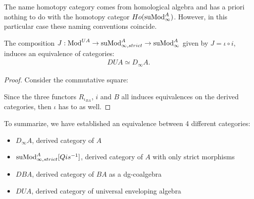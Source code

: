 \documentclass[../thesis.tex]{subfiles}
\begin{document}
            \begin{remark}
                The name homotopy category comes from homological algebra and has a priori nothing to do with the homotopy categor $Ho(\tt{suMod}_\infty^A)$. However, in this particular case these naming conventions coincide.
            \end{remark}

            \begin{lemma}
                The composition $J : \tt{Mod}^{UA} \to \tt{suMod}_{\infty, strict}^A \to \tt{suMod}_\infty^A$ given by $J = \iota \circ i$, induces an equivalence of categories:
                \begin{align*}
                    DUA \simeq D_\infty A.
                \end{align*}
            \end{lemma}

            \begin{proof}
                Consider the commutative square:
                \begin{center}
                \end{center}

                Since the three functors $R_{\iota_{BA}}$, $i$ and $B$ all induces equivalences on the derived categories, then $\iota$ has to as well.
            \end{proof}

            To summarize, we have established an equivalence between 4 different categories:
            \begin{itemize}
                \item $D_\infty A$, derived category of $A$
                \item $\tt{suMod}_{\infty, strict}^A[Qis^{-1}]$, derived category of $A$ with only strict morphisms
                \item $DBA$, derived category of $BA$ as a dg-coalgebra
                \item $DUA$, derived category of universal enveloping algebra
            \end{itemize}
\end{document}
